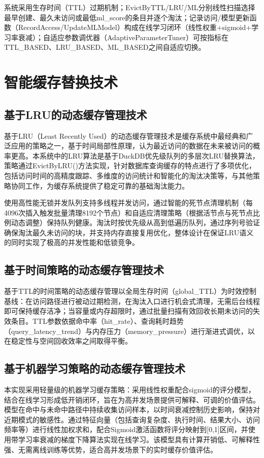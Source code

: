 系统采用生存时间（TTL）过期机制；EvictByTTL/LRU/ML分别线性扫描选择最早创建、最久未访问或最低ml\_score的条目并逐个淘汰；记录访问/模型更新函数（RecordAccess/UpdateMLModel）构成在线学习闭环（线性权重+sigmoid+学习率衰减）；自适应参数调优器（AdaptiveParameterTuner）可按指标在TTL\_BASED、LRU\_BASED、ML\_BASED之间自适应切换。

\section{智能缓存替换技术}

\subsection{基于LRU的动态缓存管理技术}

基于LRU（Least Recently Used）的动态缓存管理技术是缓存系统中最经典和广泛应用的策略之一，基于时间局部性原理，认为最近访问的数据在未来被访问的概率更高。本系统中的LRU算法是基于DuckDB优先级队列的多层次LRU替换算法，策略通过EvictByLRU()方法实现，针对数据库查询缓存的特点进行了多项优化，包括访问时间的高精度跟踪、多维度的访问统计和智能化的淘汰决策等，与其他策略协同工作，为缓存系统提供了稳定可靠的基础淘汰能力。

使用高性能无锁并发队列支持多线程并发访问，通过智能的死节点清理机制（每4096次插入触发批量清理8192个节点）和自适应清理策略（根据活节点与死节点比例动态调整）保持队列健康。淘汰时按优先级从高到低遍历队列，通过序列号验证确保淘汰最久未访问的块，并支持内存直接复用优化，整体设计在保证LRU语义的同时实现了极高的并发性能和低锁竞争。

\subsection{基于时间策略的动态缓存管理技术}

基于TTL的时间策略的动态缓存管理以全局生存时间（global\_TTL）为时效控制基线：在访问路径进行被动过期检测，在淘汰入口进行机会式清理，无需后台线程即可保持缓存洁净；当容量或内存超限时，通过批量扫描有效回收长期未访问的失效条目。TTL参数依据命中率（hit\_rate）、查询耗时趋势（query\_latency\_trend）与内存压力（memory\_pressure）进行渐进式调优，以在稳定性与空间回收效率之间取得平衡。

\subsection{基于机器学习策略的动态缓存管理技术}

本实现采用轻量级的机器学习缓存策略：采用线性权重配合sigmoid的评分模型，结合在线学习形成低开销闭环，旨在为高并发场景提供可解释、可调的价值评估。模型在命中与未命中路径中持续收集访问样本，以时间衰减控制历史影响，保持对近期模式的敏感性。通过特征向量（包括查询复杂度、执行时间、结果大小、访问频率等）进行线性加权求和，配合Sigmoid激活函数将评分映射到[0,1]区间，并使用带学习率衰减的梯度下降算法实现在线学习。该模型具有计算开销低、可解释性强、无需离线训练等优势，适合高并发场景下的实时缓存价值评估。

